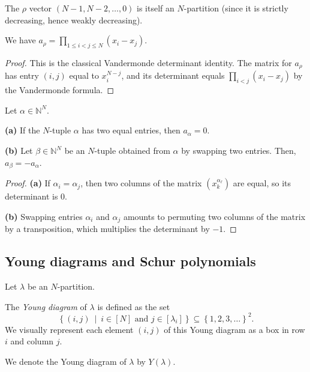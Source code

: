 \begin{definition}
\label{def.sf.rhoPartition}
\leanhelper
\leanok
The $\rho$ vector $(N{-}1, N{-}2, \ldots, 0)$ is itself an $N$-partition
(since it is strictly decreasing, hence weakly decreasing).
\end{definition}

\begin{theorem}
\label{thm.sf.alternant-rho-vandermonde}
\leanhelper
\leanok
We have
$a_\rho = \prod_{1 \le i < j \le N}(x_i - x_j)$.
\end{theorem}

\begin{proof}
\leanok
This is the classical Vandermonde determinant identity.
The matrix for $a_\rho$ has entry $(i,j)$ equal to $x_i^{N-j}$,
and its determinant equals $\prod_{i<j}(x_i - x_j)$ by the Vandermonde formula.
\end{proof}

\begin{lemma}
\label{lem.sf.alternant-0}
\leantarget
\leanok
Let $\alpha\in\mathbb{N}^{N}$. \medskip

\textbf{(a)} If the $N$-tuple $\alpha$ has two equal entries, then $a_{\alpha
}=0$. \medskip

\textbf{(b)} Let $\beta\in\mathbb{N}^{N}$ be an $N$-tuple obtained from
$\alpha$ by swapping two entries. Then, $a_{\beta}=-a_{\alpha}$.
\end{lemma}

\begin{proof}
\textbf{(a)} If $\alpha_i = \alpha_j$, then two columns of the matrix
$(x_k^{\alpha_\ell})$ are equal, so its determinant is $0$.

\textbf{(b)} Swapping entries $\alpha_i$ and $\alpha_j$ amounts to permuting
two columns of the matrix by a transposition, which multiplies the determinant by $-1$.
\end{proof}

\subsection{Young diagrams and Schur polynomials}

\begin{definition}
\label{def.sf.ydiag}
\leantarget
\leanok
Let $\lambda$ be an $N$-partition.

The \emph{Young diagram} of $\lambda$ is defined as the set%
\[
\left\{  \left(  i,j\right)  \ \mid\ i\in\left[  N\right]  \text{ and }%
j\in\left[  \lambda_{i}\right]  \right\}  \subseteq\left\{  1,2,3,\ldots
\right\}  ^{2}.
\]
We visually represent each element $\left(  i,j\right)  $ of this Young
diagram as a box in row $i$ and column $j$.

We denote the Young diagram of $\lambda$ by $Y\left(  \lambda\right)  $.
\end{definition}

